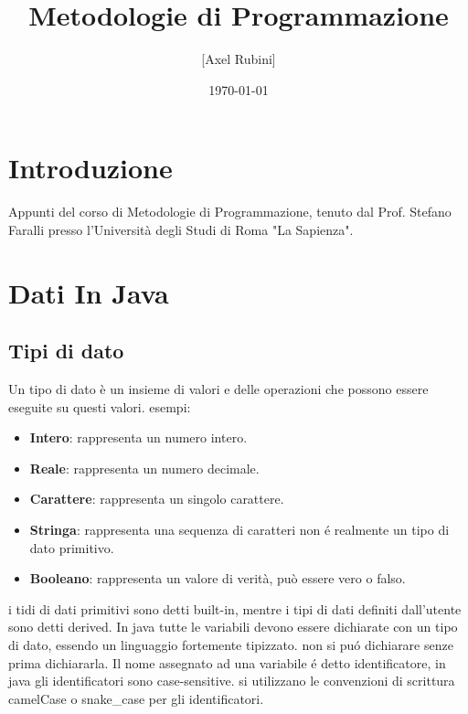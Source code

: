 \documentclass[11pt]{article}
\title{Metodologie di Programmazione}
\author{[Axel Rubini]}
\date{\today}
\begin{document}
\maketitle
\tableofcontents
\newpage

\section{Introduzione}
Appunti del corso di Metodologie di Programmazione, tenuto dal Prof. Stefano Faralli presso l'Università degli Studi di Roma "La Sapienza".

\section{Dati In Java}
\subsection{Tipi di dato}
Un tipo di dato è un insieme di valori e delle operazioni che possono essere eseguite su questi valori.
esempi:
\begin{itemize}
    \item \textbf{Intero}: rappresenta un numero intero.
    \item \textbf{Reale}: rappresenta un numero decimale.
    \item \textbf{Carattere}: rappresenta un singolo carattere.
    \item \textbf{Stringa}: rappresenta una sequenza di caratteri non é realmente un tipo di dato primitivo.
    \item \textbf{Booleano}: rappresenta un valore di verità, può essere vero o falso.
    \end{itemize}
i tidi di dati primitivi sono detti built-in, mentre i tipi di dati definiti dall'utente sono detti derived.
In java tutte le variabili devono essere dichiarate con un tipo di dato, essendo un linguaggio fortemente tipizzato.
non si puó dichiarare senze prima dichiararla.
Il nome assegnato ad una variabile é detto identificatore, in java gli identificatori sono case-sensitive.
si utilizzano le convenzioni di scrittura camelCase o snake\_case per gli identificatori.
\end{document}

